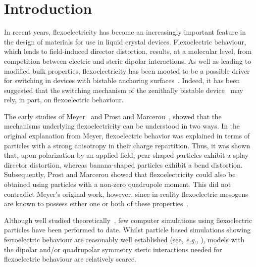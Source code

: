 \documentclass[%
reprint,
superscriptaddress,
showpacs,
 amsmath,amssymb,
 aps,
floatfix,
]{revtex4-1}
\begin{document}
\section{Introduction}

In recent years, flexoelectricity has become an increasingly important feature in the design of
materials for use in liquid crystal devices. Flexoelectric behaviour, which
leads to field-induced director distortion, results, at a molecular level, from competition
between electric and steric dipolar interactions. As well as leading to modified bulk
properties, flexoelectricity has been mooted to be a possible driver for switching in devices
with bistable anchoring surfaces~\cite{Davidson_Mottram}. Indeed, it has been suggested
that the switching mechanism of the zenithally bistable device~\cite{ZBD} may rely, in part, on
flexoelectric behaviour.

The early studies of Meyer~\cite{Meyer_69} and Prost and Marcerou~\cite{Prost_Marcerou_77},
showed that the mechanisms underlying flexoelectricity can be understood in two ways. In the
original explanation from Meyer, flexoelectric behavior was explained in terms of particles with
a strong anisotropy in their charge repartition. Thus, it was shown that, upon polarization by
an applied field, pear-shaped particles exhibit a splay director distortion, whereas
banana-shaped particles exhibit a bend distortion. Subsequently, Prost and Marcerou showed that
flexoelectricity could also be obtained using particles with a non-zero quadrupole moment. This
did not contradict Meyer's original work, however, since in reality flexoelectric mesogens are
known to possess either one or both of these properties~\cite{ProstMarcerou80}.

Although well studied theoretically~\cite{Osipov83, Osipov_84, DosovLargarde83}, few computer
simulations using flexoelectric particles have been performed to date. Whilst particle based
simulations showing ferroelectric behaviour are reasonably well established (see, {\em e.g.},
\cite{wei92a,wei92b}), models with the dipolar and/or quadrupolar symmetry steric interactions
needed for flexoelectric behaviour are relatively scarce.
\end{document}
